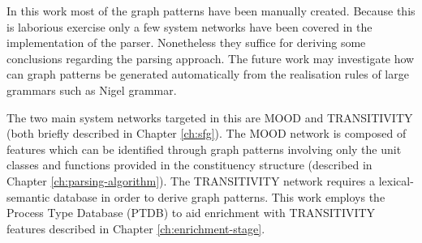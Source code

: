 In this work most of the graph patterns have been manually created. Because this is laborious exercise only a few system networks have been covered in the implementation of the parser. Nonetheless they suffice for deriving some conclusions regarding the parsing approach. The future work may investigate how can graph patterns be generated automatically from the realisation rules of large grammars such as Nigel grammar. 

The two main system networks targeted in this are MOOD and TRANSITIVITY (both briefly described in Chapter \ref{ch:sfg}). The MOOD network is composed of features which can be identified through graph patterns involving only the unit classes and functions provided in the constituency structure (described in Chapter \ref{ch:parsing-algorithm}). The TRANSITIVITY network requires a lexical-semantic database in order to derive graph patterns. This work employs the Process Type Database (PTDB) \citep{Neale2002} to aid enrichment with TRANSITIVITY features described in Chapter \ref{ch:enrichment-stage}.  










